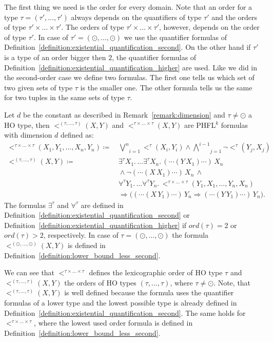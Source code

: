 The first thing we need is the order for every domain. Note that an order for a type $\tau = (\tau', \dots, \tau')$ always
depends on the quantifiers of type $\tau'$ and the orders of type $\tau' \times \dots \times \tau'$. The orders of type $\tau' \times \dots \times \tau'$, however, depends on the order of type $\tau'$. In case of $\tau' = (\odot, \dots, \odot)$ we use the quantifier formulas of Definition~\ref{definition:existential_quantification_second}. On the other hand if $\tau'$ is a type of an order bigger then $2$, the quantifier formulas of Definition~\ref{definition:existential_quantification_higher} are used. Like we did in the second-order case we define two formulas. The first
one tells us which set of two given sets of type $\tau$ is the smaller one. The other formula tells us the same for two
tuples in the same sets of type $\tau$.

\begin{definition}
    \label{definition:lower_bound_less_higher}
    Let $d$ be the constant as described in Remark~\ref{remark:dimension} and $\tau \neq \odot$ a HO
    type, then $<^{(\tau, \dots, \tau)}(X, Y)$ and $<^{\tau \times \dots \times \tau}(X, Y)$ are PHFL$^k$ formulas
    with dimension $d$ defined as:
    \begin{align*}
        <^{\tau \times \dots \times \tau}(X_1, Y_1, \dots, X_n, Y_n) \coloneqq &\,\underset{i =
        1}{\overset{n}{\bigvee}}<^{\tau}(X_i, Y_i) \wedge \underset{j = 1}{\overset{i - 1}{\bigwedge}}
        \neg <^{\tau}(Y_j, X_j)\\
        <^{(\tau, \dots, \tau)}(X, Y) \coloneqq &\,\exists^{\tau}X_1. \,\dots \exists^{\tau}X_n.\,(\dotsb(Y\,X_1)\dotsb)\,X_n\\
        &\,\wedge \neg (\dotsb(X\,X_1) \dotsb)\,X_n\,\wedge \\&\,\forall^{\tau}Y_1. \,\dots
        \forall^{\tau}Y_n.\,<^{\tau \times \dots \times \tau}
        (Y_1, X_1, \dots, Y_n, X_n) \\&\,\Rightarrow \big((\dotsb(X\,Y_1) \dotsb)\,Y_n \Rightarrow (\dotsb(Y\,Y_1)
         \dotsb)\,Y_n\big).
    \end{align*}
    The formulas $\exists^\tau$ and $\forall^\tau$ are defined in Definition~\ref{definition:existential_quantification_second} or Definition~\ref{definition:existential_quantification_higher} if $ord(\tau) = 2$ or $ord(\tau) > 2$, respectively. In case of $\tau = (\odot, \dots, \odot)$ the formula $<^{(\odot, \dots, \odot)}(X, Y)$ is defined in Definition~\ref{definition:lower_bound_less_second}.
\end{definition}
We can see that $<^{\tau \times \dots \times \tau}$ defines the lexicographic order of HO type $\tau$ and $<^{(\tau, \dots, \tau)}(X, Y)$ the orders of HO types $(\tau, \dots, \tau)$, where $\tau \neq \odot$. Note, that $<^{(\tau, \dots, \tau)}(X, Y)$ is well defined because the formula uses the quantifier formulas of a lower type and the lowest possible type is already defined in Definition~\ref{definition:existential_quantification_second}. The same holds for $<^{\tau \times \dots \times \tau}$, where the lowest used order formula is defined in Definition~\ref{definition:lower_bound_less_second}. 

